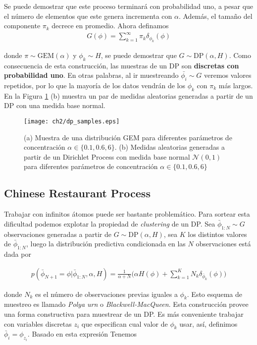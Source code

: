 \documentclass[letterpaper,12pt,oneside]{book} %
\begin{document}
Se puede demostrar que este proceso terminará con probabilidad uno, a pesar que el número de elementos que este genera incrementa con $\alpha$. Además, el tamaño del componente $\pi_{k}$ decrece en promedio. Ahora definamos 
\begin{align}
    G(\phi) = \sum_{k=1}^{\infty}\pi_{k}\delta_{\phi_{k}}(\phi)
\end{align}

donde $\pi \sim \text{GEM}(\alpha)$ y $\phi_{k} \sim H$, se puede demostrar que $G \sim \text{DP}(\alpha, H)$. Como consecuencia de esta construcción, las muestras de un DP son \textbf{discretas con probabilidad uno}. En otras palabras, al ir muestreando $\bar{\phi_{i}}\sim G$ veremos valores repetidos, por lo que la mayoría de los datos vendrán de los $\phi_{k}$ con $\pi_{k}$ más largos. En la Figura \ref{img:dp_samples} (b) muestra un par de medidas aleatorias generadas a partir de un DP con una medida base normal.\\

\begin{figure}
    \centering
    \texttt{[image: ch2/dp\_samples.eps]}
    \caption{(a) Muestra de una distribución GEM para diferentes parámetros de concentración $\alpha\in \{0.1, 0.6, 6\}$. (b) Medidas aleatorias generadas a partir de un Dirichlet Process con medida base normal $\mathcal{N}(0,1)$ para diferentes parámetros de concentración $\alpha\in \{0.1, 0.6, 6\}$}
    \label{img:dp_samples}
\end{figure}

\subsection{Chinese Restaurant Process}
\label{sec:crp}

Trabajar con infinitos átomos puede ser bastante problemático. Para sortear esta dificultad podemos explotar la propiedad de \textit{clustering} de un DP. Sea $\bar{\phi}_{1:N}\sim G$ observaciones generadas a partir de $G\sim \text{DP}(\alpha, H)$, sea $K$ los distintos valores de $\bar{\phi}_{1:N}$, luego la distribución predictiva condicionada en las $N$ observaciones está dada por

\begin{align}
p(\bar{\phi}_{N+1}=\phi|\bar{\phi}_{1:N}, \alpha, H) = \frac{1}{\alpha+N}\bigg(\alpha H(\phi)+\sum_{k=1}^{K}N_{k}\delta_{\bar{\phi}_{k}}(\phi)\bigg)
\end{align}

donde $N_{k}$ es el número de observaciones previas iguales a $\phi_{k}$. Esto esquema de muestreo es llamado \textit{Polya urn} o \textit{Blackwell-MacQueen}. Esta construcción provee una forma constructiva para muestrear de un DP. Es más conveniente trabajar con variables discretas $z_{i}$ que especifican cual valor de $\phi_{k}$ usar, así, definimos $\bar{\phi}_{i}=\phi_{z_{i}}$. Basado en esta expresión Tenemos
\end{document}
